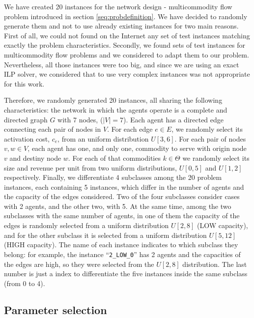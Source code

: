 \documentclass{article}
\begin{document}
We have created 20 instances for the network design - multicommodity flow problem introduced in section \ref{seq:probdefinition}. We have decided to randomly generate them and not to use already existing instances for two main reasons. First of all, we could not found on the Internet any set of test instances matching exactly the problem characteristics. Secondly, we found sets of test instances for multicommodity flow problems \parencite{MCFPWEB} and we considered to adapt them to our problem. Nevertheless, all those instances were too big, and since we are using an exact ILP solver, we considered that to use very complex instances was not appropriate for this work.

Therefore, we randomly generated 20 instances, all sharing the following characteristics: the network in which the agents operate is a complete and directed graph $G$ with 7 nodes, ($|V|=7$). Each agent has a directed edge connecting each pair of nodes in $V$. For each edge $e\in E$, we randomly select its activation cost, $c_e$, from an uniform distribution $U[3,6]$. For each pair of nodes $v,w\in V$, each agent has one, and only one, commodity to serve with origin node $v$ and destiny node $w$. For each of that commodities $k\in \Theta$ we randomly select its size and revenue per unit from two uniform distributions, $U[0,5]$ and $U[1,2]$ respectively. Finally, we differentiate 4 subclasses among the 20 problem instances, each containing 5 instances, which differ in the number of agents and the capacity of the edges considered. Two of the four subclasses consider cases with 2 agents, and the other two, with 5. At the same time, among the two subclasses with the same number of agents,  in one of them the capacity of the edges is randomly selected from a uniform distribution $U[2,8]$ (LOW capacity), and for the other subclass it is selected from a uniform distribution $U[5,12]$ (HIGH capacity).
The name of each instance indicates to which subclass they belong: for example, the instance ``\texttt{2\_LOW\_0}'' has 2 agents and the capacities of the edges are high, so they were selected from the $U[2,8]$ distribution. The last number is just a index to differentiate the five instances inside the same subclass (from 0 to 4).

\subsection{Parameter selection}
\end{document}
